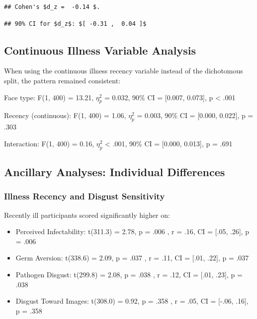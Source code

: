 \documentclass[
  english,
  man]{apa6}
\providecommand{\tightlist}{%
  \setlength{\itemsep}{0pt}\setlength{\parskip}{0pt}}
\begin{document}
\begin{verbatim}
## Cohen's $d_z =  -0.14 $.
\end{verbatim}

\begin{verbatim}
## 90% CI for $d_z$: $[ -0.31 ,  0.04 ]$
\end{verbatim}

\subsection{Continuous Illness Variable Analysis}\label{continuous-illness-variable-analysis}

When using the continuous illness recency variable instead of the dichotomous split, the pattern remained consistent:

Face type: F(1, 400) = 13.21, \(\eta_{p}^{2}\) = 0.032, 90\% CI = {[}0.007, 0.073{]}, p \textless{} .001

Recency (continuous): F(1, 400) = 1.06, \(\eta_{p}^{2}\) = 0.003, 90\% CI = {[}0.000, 0.022{]}, p = .303

Interaction: F(1, 400) = 0.16, \(\eta_{p}^{2}\) \textless{} .001, 90\% CI = {[}0.000, 0.013{]}, p = .691

\subsection{Ancillary Analyses: Individual Differences}\label{ancillary-analyses-individual-differences}

\subsubsection{Illness Recency and Disgust Sensitivity}\label{illness-recency-and-disgust-sensitivity}

Recently ill participants scored significantly higher on:

\begin{itemize}
\tightlist
\item
  Perceived Infectability: t(311.3) = 2.78, p = .006 , r = .16, CI = {[}.05, .26{]}, p = .006
\item
  Germ Aversion: t(338.6) = 2.09, p = .037 , r = .11, CI = {[}.01, .22{]}, p = .037
\item
  Pathogen Disgust: t(299.8) = 2.08, p = .038 , r = .12, CI = {[}.01, .23{]}, p = .038
\item
  Disgust Toward Images: t(308.0) = 0.92, p = .358 , r = .05, CI = {[}-.06, .16{]}, p = .358
\end{itemize}
\end{document}
